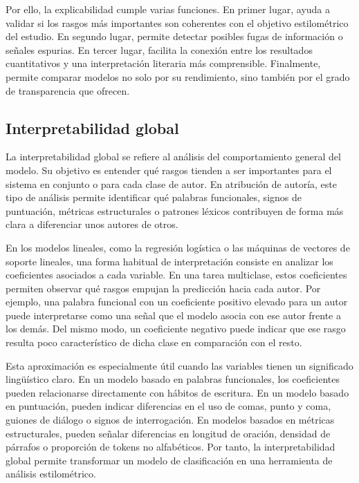 \documentclass[IB]{TFUOC}%
\begin{document}
Por ello, la explicabilidad cumple varias funciones. En primer lugar, ayuda a validar si los rasgos más importantes son coherentes con el objetivo estilométrico del estudio. En segundo lugar, permite detectar posibles fugas de información o señales espurias. En tercer lugar, facilita la conexión entre los resultados cuantitativos y una interpretación literaria más comprensible. Finalmente, permite comparar modelos no solo por su rendimiento, sino también por el grado de transparencia que ofrecen.

\subsection{Interpretabilidad global}

La interpretabilidad global se refiere al análisis del comportamiento general del modelo. Su objetivo es entender qué rasgos tienden a ser importantes para el sistema en conjunto o para cada clase de autor. En atribución de autoría, este tipo de análisis permite identificar qué palabras funcionales, signos de puntuación, métricas estructurales o patrones léxicos contribuyen de forma más clara a diferenciar unos autores de otros.

En los modelos lineales, como la regresión logística o las máquinas de vectores de soporte lineales, una forma habitual de interpretación consiste en analizar los coeficientes asociados a cada variable. En una tarea multiclase, estos coeficientes permiten observar qué rasgos empujan la predicción hacia cada autor. Por ejemplo, una palabra funcional con un coeficiente positivo elevado para un autor puede interpretarse como una señal que el modelo asocia con ese autor frente a los demás. Del mismo modo, un coeficiente negativo puede indicar que ese rasgo resulta poco característico de dicha clase en comparación con el resto.

Esta aproximación es especialmente útil cuando las variables tienen un significado lingüístico claro. En un modelo basado en palabras funcionales, los coeficientes pueden relacionarse directamente con hábitos de escritura. En un modelo basado en puntuación, pueden indicar diferencias en el uso de comas, punto y coma, guiones de diálogo o signos de interrogación. En modelos basados en métricas estructurales, pueden señalar diferencias en longitud de oración, densidad de párrafos o proporción de tokens no alfabéticos. Por tanto, la interpretabilidad global permite transformar un modelo de clasificación en una herramienta de análisis estilométrico.
\end{document}

